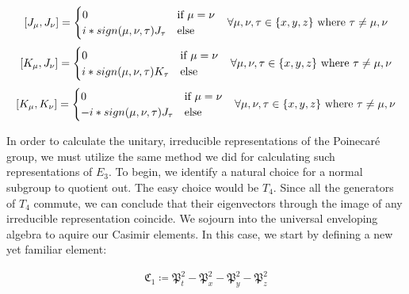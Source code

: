 \documentclass[10pt]{ucthesis}
\begin{document}
\begin{equation}
\begin{aligned}
	[J_\mu,J_\nu] = \begin{cases}
							0 &\text{if } \mu=\nu \\
							i*sign(\mu,\nu,\tau)J_\tau & \text{else}
						\end{cases} \hspace{3mm} \forall \mu,\nu,\tau\in\{x,y,z\}\text{ where }\tau \neq\mu,\nu
\end{aligned}
\end{equation}
\begin{equation}
\begin{aligned}
	[K_\mu,J_\nu] = \begin{cases}
							0 &\text{if } \mu=\nu \\
							i*sign(\mu,\nu,\tau)K_\tau & \text{else}
						\end{cases} \hspace{3mm} \forall \mu,\nu,\tau\in\{x,y,z\}\text{ where }\tau \neq\mu,\nu
\end{aligned}
\end{equation}
\begin{equation}
\begin{aligned}
	[K_\mu,K_\nu] = \begin{cases}
							0 &\text{if } \mu=\nu \\
							-i*sign(\mu,\nu,\tau)J_\tau & \text{else}
						\end{cases} \hspace{3mm} \forall \mu,\nu,\tau\in\{x,y,z\}\text{ where }\tau \neq\mu,\nu
\end{aligned}
\end{equation}

In order to calculate the unitary, irreducible representations of the Poinecar\'e group, we must utilize the same method we did for calculating such representations of $E_3$. To begin, we identify a natural choice for a normal subgroup to quotient out. The easy choice would be $T_4$. Since all the generators of $T_4$ commute, we can conclude that their eigenvectors through the image of any irreducible representation coincide. We sojourn into the universal enveloping algebra to aquire our Casimir elements. In this case, we start by defining a new yet familiar element:

 
\begin{equation}
\begin{aligned}
	\mathfrak{C}_1 \coloneq \mathfrak{P}_t^2 -  \mathfrak{P}_x^2 -\mathfrak{P}_y^2- \mathfrak{P}_z^2
\end{aligned}
\end{equation}
\end{document}
